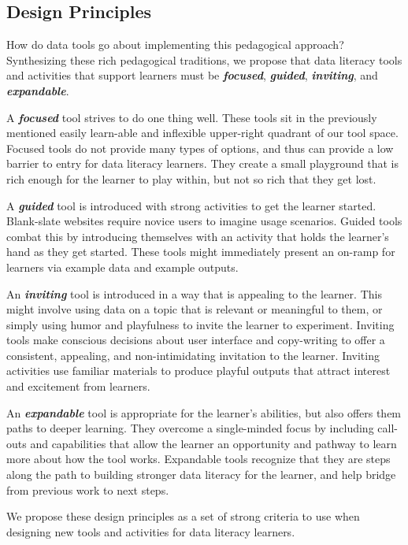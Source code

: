 \documentclass{acm_proc_article-sp}
\begin{document}
\subsection{Design Principles}

How do data tools go about implementing this pedagogical approach?  Synthesizing these rich pedagogical traditions, we propose that data literacy tools and activities that support learners must be \textbf{\textit{focused}}, \textbf{\textit{guided}}, \textbf{\textit{inviting}}, and \textbf{\textit{expandable}}.  

A \textbf{\textit{focused}} tool strives to do one thing well.  These tools sit in the previously mentioned easily learn-able and inflexible upper-right quadrant of our tool space.  Focused tools do not provide many types of options, and thus can provide a low barrier to entry for data literacy learners.  They create a small playground that is rich enough for the learner to play within, but not so rich that they get lost.

A \textbf{\textit{guided}} tool is introduced with strong activities to get the learner started.  Blank-slate websites require novice users to imagine usage scenarios.  Guided tools combat this by introducing themselves with an activity that holds the learner's hand as they get started.  These tools might immediately present an on-ramp for learners via example data and example outputs.

An \textbf{\textit{inviting}} tool is introduced in a way that is appealing to the learner. This might involve using data on a topic that is relevant or meaningful to them, or simply using humor and playfulness to invite the learner to experiment.  Inviting tools make conscious decisions about user interface and copy-writing to offer a consistent, appealing, and non-intimidating invitation to the learner. Inviting activities use familiar materials to produce playful outputs that attract interest and excitement from learners.

An \textbf{\textit{expandable}} tool is appropriate for the learner's abilities, but also offers them paths to deeper learning.  They overcome a single-minded focus by including call-outs and capabilities that allow the learner an opportunity and pathway to learn more about how the tool works.  Expandable tools recognize that they are steps along the path to building stronger data literacy for the learner, and help bridge from previous work to next steps.

We propose these design principles as a set of strong criteria to use when designing new tools and activities for data literacy learners.
\end{document}
